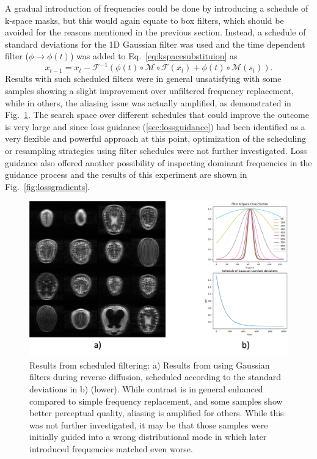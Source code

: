 A gradual introduction of frequencies could be done by introducing a schedule of k-space masks, but this would again equate to box filters, which should be avoided for the reasons mentioned in the previous section. Instead, a schedule of standard deviations for the 1D Gaussian filter was used and the time dependent filter ($\phi \rightarrow \phi(t)$) was added to Eq.~\ref{eq:kspacesubstituion} as
\begin{equation}
    x_{t-1} = x_t - \mathcal{F}^{-1}\left(\phi(t)\circ\mathcal{M}\circ\mathcal{F}(x_t) + \phi(t)\circ\mathcal{M}(s_t)\right).
\end{equation}
Results with such scheduled filters were in general unsatisfying with some samples showing a slight improvement over unfiltered frequency replacement, while in others, the aliasing issue was actually amplified, as demonstrated in Fig.~\ref{fig:filtereddiffusion}. The search space over different schedules that could improve the outcome is very large and since loss guidance (\ref{sec:lossguidance}) had been identified as a very flexible and powerful approach at this point, optimization of the scheduling or resampling strategies using filter schedules were not further investigated. Loss guidance also offered another possibility of inspecting dominant frequencies in the guidance process and the results of this experiment are shown in Fig.~\ref{fig:lossgradients}.
\begin{figure}
    \centering
    \includegraphics[width=.7\textwidth]{images/filtereddiffusion.png}
    \caption[short]{Results from scheduled filtering: a) Results from using Gaussian filters during reverse diffusion, scheduled according to the standard deviations in b) (lower). While contrast is in general enhanced compared to simple frequency replacement, and some samples show better perceptual quality, aliasing is amplified for others. While this was not further investigated, it may be that those samples were initially guided into a wrong distributional mode in which later introduced frequencies matched even worse.}
    \label{fig:filtereddiffusion}
\end{figure}

